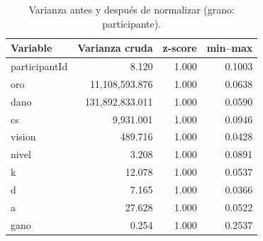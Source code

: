 \begin{table}[H]
\centering
\small
\caption{Varianza antes y después de normalizar (grano: participante).}
\label{tab:varianza}
\begin{tabular}{lrrr}
\toprule
Variable & Varianza cruda & z-score & min--max \\
\midrule
participantId & 8.120 & 1.000 & 0.1003 \\
oro & 11,108,593.876 & 1.000 & 0.0638 \\
dano & 131,892,833.011 & 1.000 & 0.0590 \\
cs & 9,931.001 & 1.000 & 0.0946 \\
vision & 489.716 & 1.000 & 0.0428 \\
nivel & 3.208 & 1.000 & 0.0891 \\
k & 12.078 & 1.000 & 0.0537 \\
d & 7.165 & 1.000 & 0.0366 \\
a & 27.628 & 1.000 & 0.0522 \\
gano & 0.254 & 1.000 & 0.2537 \\
\bottomrule
\end{tabular}
\end{table}
